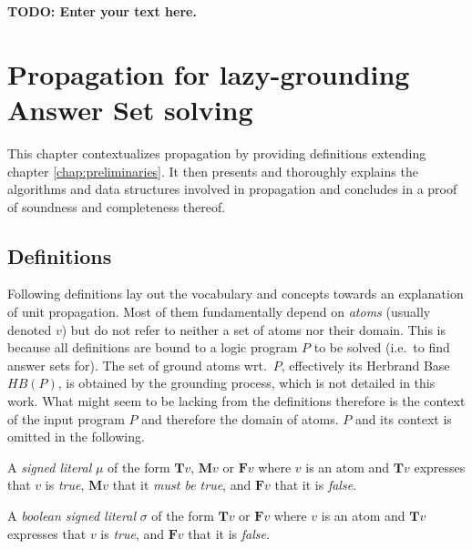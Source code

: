 \documentclass{vutinfth} %
\newcommand{\todo}[1]{{\color{red}\textbf{TODO: {#1}}}} %
\theoremstyle{example}
\theoremstyle{definition}
\newtheorem{definition}{Definition}[section]
\theoremstyle{theorem}
\theoremstyle{lemma}
\theoremstyle{corollary}
\newcommand{\bT}{\mathbf{T}}
\newcommand{\bM}{\mathbf{M}}
\newcommand{\bF}{\mathbf{F}}
\newcommand{\sgl}{\mu}
\newcommand{\bsgl}{\sigma}
\begin{document}
\todo{Enter your text here.}

\chapter{Propagation for lazy-grounding Answer Set solving}

This chapter contextualizes propagation by providing definitions extending chapter \ref{chap:preliminaries}. It then presents and thoroughly explains the algorithms and data structures involved in propagation and concludes in a proof of soundness and completeness thereof.

\section{Definitions}


Following definitions lay out the vocabulary and concepts towards an explanation of unit propagation. Most of them fundamentally depend on \emph{atoms} (usually denoted $v$) but do not refer to neither a set of atoms nor their domain. This is because all definitions are bound to a logic program $P$ to be solved (i.e.~to find answer sets for). The set of ground atoms wrt.~$P$, effectively its Herbrand Base $\textit{HB}(P)$, is obtained by the grounding process, which is not detailed in this work. What might seem to be lacking from the definitions therefore is the context of the input program $P$ and therefore the domain of atoms. $P$ and its context is omitted in the following.


A \emph{signed literal} $\sgl$ of the form $\bT v$, $\bM v$ or $\bF v$ where $v$ is an atom and $\bT v$ expresses that $v$ is \emph{true}, $\bM v$ that it \emph{must be true}, and $\bF v$ that it is \emph{false}.

A \emph{boolean signed literal} $\bsgl$ of the form $\bT v$ or $\bF v$ where $v$ is an atom and  $\bT v$ expresses that $v$ is \emph{true}, and $\bF v$ that it is \emph{false}.
\end{document}
